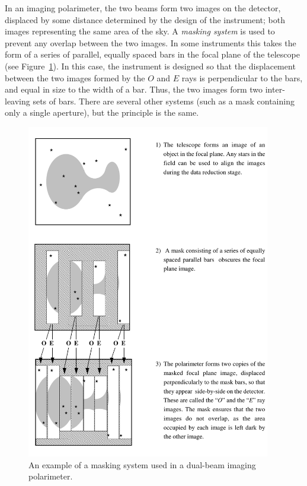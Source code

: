 \documentclass[twoside,11pt]{starlink}
\begin{document}
In an imaging polarimeter, the two beams form two images on the detector,
displaced by some distance determined by the design of the instrument;
both images representing the same area of the sky. A \emph{masking system}
is used to prevent any overlap between the two images. In some
instruments this takes the form of a series of parallel, equally spaced
bars in the focal plane of the telescope (see
Figure~\ref{fig:grids}). In
this case, the instrument is designed so that the displacement between
the two images formed by the $O$ and $E$ rays is perpendicular to the
bars, and equal in size to the width of a bar. Thus, the two images form
two inter-leaving sets of bars. There are several other systems (such as
a mask containing only a single aperture), but the principle is the same.

  \begin{figure}[p]
  \begin{center}
  \includegraphics[clip,width=0.95\textwidth]{sun223_figures/grids}
  \caption{An example of a masking system used in a dual-beam imaging polarimeter.}
  \label{fig:grids}
  \end{center}
  \end{figure}
\end{document}
